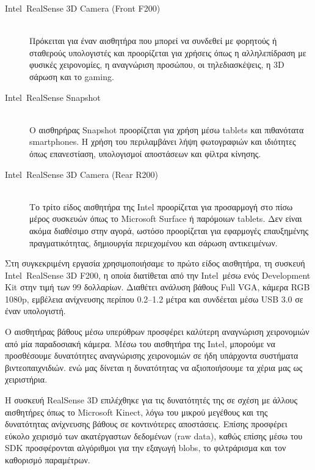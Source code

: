 \begin{description}
  \item[Intel\textregistered\ RealSense\texttrademark{} 3D Camera (Front F200)] \hfill \\
  Πρόκειται για έναν αισθητήρα που μπορεί να συνδεθεί με φορητούς ή σταθερούς υπολογιστές και προορίζεται για χρήσεις όπως η αλληλεπίδραση με φυσικές χειρονομίες, η αναγνώριση προσώπου, οι τηλεδιασκέψεις, η 3D σάρωση και το gaming.
  
  \item[Intel\textregistered\ RealSense\texttrademark{} Snapshot] \hfill \\
 Ο αισθηρήρας Snapshot προορίζεται για χρήση μέσω tablets και πιθανότατα smartphones. Η χρήση του περιλαμβάνει λήψη φωτογραφιών και ιδιότητες όπως επανεστίαση, υπολογισμοί αποστάσεων και φίλτρα κίνησης. 


  \item[Intel\textregistered\ RealSense\texttrademark{} 3D Camera (Rear R200)] \hfill \\
  Το τρίτο είδος αισθητήρα της Intel προορίζεται για προσαρμογή στο πίσω μέρος συσκευών όπως το Microsoft Surface ή παρόμοιων tablets. Δεν είναι ακόμα διαθέσιμο στην αγορά, ωστόσο προορίζεται για εφαρμογές επαυξημένης πραγματικότητας, δημιουργία περιεχομένου και σάρωση αντικειμένων.
\end{description}




Στη συγκεκριμένη εργασία χρησιμοποιήσαμε το πρώτο είδος αισθητήρα, τη συσκευή Intel\textregistered\ RealSense\texttrademark{} 3D F200, η οποία διατίθεται από την Intel\textregistered\ μέσω ενός Development Kit στην τιμή των 99 δολλαρίων. Διαθέτει ανάλυση βάθους Full VGA, κάμερα RGB 1080p, εμβέλεια ανίχνευσης περίπου 0.2–1.2 μέτρα και συνδέεται μέσω USB 3.0 σε έναν υπολογιστή.


Ο αισθητήρας βάθους μέσω υπερύθρων προσφέρει καλύτερη αναγνώριση χειρονομιών από μία παραδοσιακή κάμερα. Μέσω του αισθητήρα της Intel, μπορούμε να προσθέσουμε δυνατότητες αναγνώρισης χειρονομιών σε ήδη υπάρχοντα συστήματα βιντεοπαιχνιδιών.
ενώ μας δίνεται η δυνατότητας να αξιοποιήσουμε τα χέρια μας ως χειριστήρια.

Η συσκευή RealSense\texttrademark{} 3D επιλέχθηκε για τις δυνατότητές της σε σχέση με άλλους αισθητήρες όπως το Microsoft Kinect, λόγω του μικρού μεγέθους και της δυνατότητας ανίχνευσης βάθους σε κοντινότερες αποστάσεις. Επίσης προσφέρει εύκολο χειρισμό των ακατέργαστων δεδομένων (raw data), καθώς επίσης μέσω του SDK προσφέρονται αλγόριθμοι για την εξαγωγή blobs, το φιλτράρισμα και τον καθορισμό παραμέτρων. 



